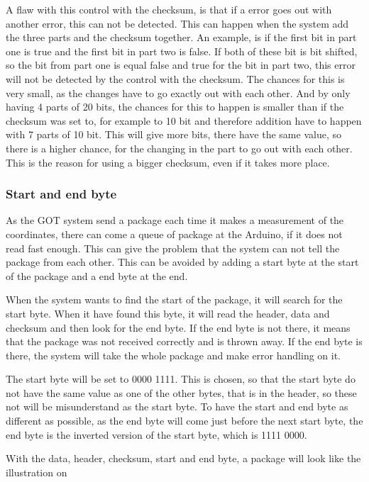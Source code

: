 A flaw with this control with the checksum, is that if a error goes out with another error, this can not be detected. This can happen when the system add the three parts and the checksum together. An example, is if the first bit in part one is true and the first bit in part two is false. If both of these bit is bit shifted, so the bit from part one is equal false and true for the bit in part two, this error will not be detected by the control with the checksum. The chances for this is very small, as the changes have to go exactly out with each other. And by only having 4 parts of 20 bits, the chances for this to happen is smaller than if the checksum was set to, for example to 10 bit and therefore addition have to happen with 7 parts of 10 bit. This will give more bits, there have the same value, so there is a higher chance, for the changing in the part to go out with each other. This is the reason for using a bigger checksum, even if it takes more place.

\subsubsection{Start and end byte}

As the GOT system send a package each time it makes a measurement of the coordinates, there can come a queue of package at the Arduino, if it does not read fast enough. This can give the problem that the system can not tell the package from each other. This can be avoided by adding a start byte at the start of the package and a end byte at the end. 

When the system wants to find the start of the package, it will search for the start byte. When it have found this byte, it will read the header, data and checksum and then look for the end byte. If the end byte is not there, it means that the package was not received correctly and is thrown away. If the end byte is there, the system will take the whole package and make error handling on it. 

The start byte will be set to 0000 1111. This is chosen, so that the start byte do not have the same value as one of the other bytes, that is in the header, so these not will be misunderstand as the start byte. To have the start and end byte as different as possible, as the end byte will come just before the next start byte, the end byte is the inverted version of the start byte, which is 1111 0000.


With the data, header, checksum, start and end byte, a package will look like the illustration on 

